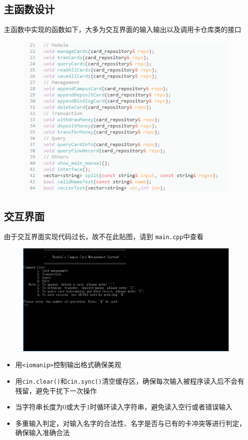 \documentclass[11pt,UTF8]{ctexart}
\begin{document}
\subsection{主函数设计}
\par 主函数中实现的函数如下，大多为交互界面的输入输出以及调用卡仓库类的接口
\begin{figure}[H]
\centering
\includegraphics[width=0.9\linewidth]{pic/main_function.PNG}
\end{figure}

\subsection{交互界面}
\par 由于交互界面实现代码过长，故不在此贴图，请到 \verb'main.cpp'中查看
\begin{figure}[H]
\centering
\includegraphics[width=\linewidth]{pic/interface.PNG}
\end{figure}
\begin{itemize}
	\item 用\verb'<iomanip>'控制输出格式确保美观
	\item 用\verb'cin.clear()'和\verb'cin.sync()'清空缓存区，确保每次输入被程序读入后不会有残留，避免干扰下一次操作
	\item 当字符串长度为$0$或大于$1$时循环读入字符串，避免读入空行或者错误输入
	\item 多重输入判定，对输入名字的合法性、名字是否与已有的卡冲突等进行判定，确保输入准确合法
\end{itemize}
\end{document}
